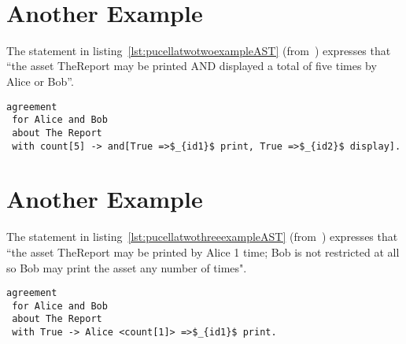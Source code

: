 \begin{minipage}[c]{0.95\textwidth}
\begin{lstlisting}


\end{lstlisting}
\end{minipage} 














\section {Another Example}
The statement in listing~\ref{lst:pucellatwotwoexampleAST} (from~\cite{pucella2006}) expresses that ``the asset TheReport may be printed AND displayed a total of five times by Alice or Bob''.


\lstset{language=Pucella2006}
\begin{minipage}[c]{0.95\textwidth}
\begin{lstlisting}[frame=single, caption={Agreement of Example 2.2}, label={lst:pucellatwotwoexampleAST}, mathescape]
agreement
 for Alice and Bob 
 about The Report 
 with count[5] -> and[True =>$_{id1}$ print, True =>$_{id2}$ display].
\end{lstlisting}
\end{minipage} 
%
\section {Another Example}
The statement in listing~\ref{lst:pucellatwothreeexampleAST} (from~\cite{pucella2006}) expresses that ``the asset TheReport may be printed by Alice 1 time; Bob is not restricted at all so Bob may print the asset any number of times".

\lstset{language=Pucella2006}
\begin{minipage}[c]{0.95\textwidth}
\begin{lstlisting}[frame=single, caption={Agreement of Example 2.3}, label={lst:pucellatwothreeexampleAST}, mathescape]
agreement
 for Alice and Bob 
 about The Report 
 with True -> Alice <count[1]> =>$_{id1}$ print.
\end{lstlisting}
\end{minipage} 
%

